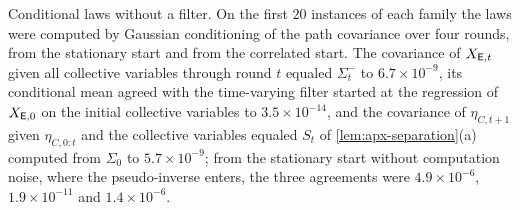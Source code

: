 \begin{numcheck}
Conditional laws without a filter. On the first $20$ instances of each family the laws were computed by Gaussian conditioning of the path covariance over four rounds, from the stationary start and from the correlated start. The covariance of $X_{\mathsf{E},t}$ given all collective variables through round $t$ equaled $\Sigma^-_t$ to $6.7\times10^{-9}$, its conditional mean agreed with the time-varying filter started at the regression of $X_{\mathsf{E},0}$ on the initial collective variables to $3.5\times10^{-14}$, and the covariance of $\eta_{C,t+1}$ given $\eta_{C,0:t}$ and the collective variables equaled $S_t$ of \cref{lem:apx-separation}(a) computed from $\Sigma_0$ to $5.7\times10^{-9}$; from the stationary start without computation noise, where the pseudo-inverse enters, the three agreements were $4.9\times10^{-6}$, $1.9\times10^{-11}$ and $1.4\times10^{-6}$.


\end{numcheck}
